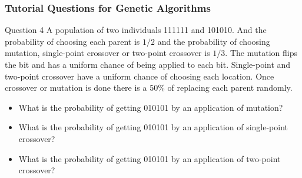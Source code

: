 \documentclass[aspectratio=169, 10pt]{beamer}
\begin{document}
\begin{frame}
    \frametitle{Tutorial Questions for Genetic Algorithms}

    \begin{block}{Question 4}
        A population of two individuals 111111 and 101010. 
        And the probability of choosing each parent is $1/2$ and the probability of choosing mutation, 
        single-point crossover or two-point crossover is $1/3$. 
        The mutation flips the bit and has a uniform chance of being applied to each bit. 
        Single-point and two-point crossover have a uniform chance of choosing each location. 
        Once crossover or mutation is done there is a 50\% of replacing each parent randomly.
    \end{block}

    \begin{itemize}
        \item What is the probability of getting 010101 by an application of mutation?
        \item What is the probability of getting 010101 by an application of single-point crossover?
        \item What is the probability of getting 010101 by an application of two-point crossover?
    \end{itemize}
    
\end{frame}
\end{document}
